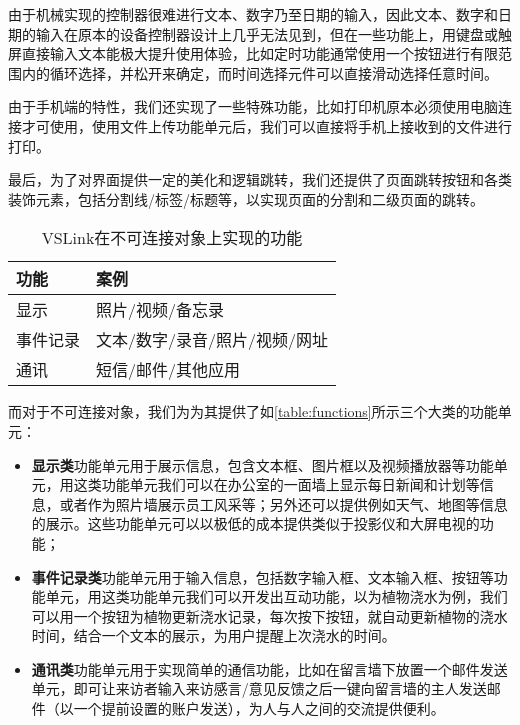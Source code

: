 由于机械实现的控制器很难进行文本、数字乃至日期的输入，因此文本、数字和日期的输入在原本的设备控制器设计上几乎无法见到，但在一些功能上，用键盘或触屏直接输入文本能极大提升使用体验，比如定时功能通常使用一个按钮进行有限范围内的循环选择，并松开来确定，而时间选择元件可以直接滑动选择任意时间。

由于手机端的特性，我们还实现了一些特殊功能，比如打印机原本必须使用电脑连接才可使用，使用文件上传功能单元后，我们可以直接将手机上接收到的文件进行打印。

最后，为了对界面提供一定的美化和逻辑跳转，我们还提供了页面跳转按钮和各类装饰元素，包括分割线/标签/标题等，以实现页面的分割和二级页面的跳转。

\begin{table}[htbp]
	\caption{VSLink在不可连接对象上实现的功能}  \label{table:functions}  
	\begin{center}  
		\begin{tabular}{|l|l|}  
			\hline  
			\textbf{功能} & \textbf{案例} \\ \hline  
			显示 & 照片/视频/备忘录   \\ \hline 
			事件记录 & 文本/数字/录音/照片/视频/网址   \\ \hline 
			通讯 & 短信/邮件/其他应用   \\ \hline  
		\end{tabular}  
	\end{center}  
\end{table}

而对于不可连接对象，我们为为其提供了如\autoref{table:functions}所示三个大类的功能单元：

\begin{itemize}
	\item \textbf{显示类}功能单元用于展示信息，包含文本框、图片框以及视频播放器等功能单元，用这类功能单元我们可以在办公室的一面墙上显示每日新闻和计划等信息，或者作为照片墙展示员工风采等；另外还可以提供例如天气、地图等信息的展示。这些功能单元可以以极低的成本提供类似于投影仪和大屏电视的功能；
	\item \textbf{事件记录类}功能单元用于输入信息，包括数字输入框、文本输入框、按钮等功能单元，用这类功能单元我们可以开发出互动功能，以为植物浇水为例，我们可以用一个按钮为植物更新浇水记录，每次按下按钮，就自动更新植物的浇水时间，结合一个文本的展示，为用户提醒上次浇水的时间。
	\item \textbf{通讯类}功能单元用于实现简单的通信功能，比如在留言墙下放置一个邮件发送单元，即可让来访者输入来访感言/意见反馈之后一键向留言墙的主人发送邮件（以一个提前设置的账户发送），为人与人之间的交流提供便利。
\end{itemize}


